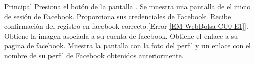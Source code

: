 	\newpage
	\begin{UCtrayectoria}{Principal}
	\UCpaso [\UCactor] Presiona el botón   de la pantalla  .
	\UCpaso Se muestra una pantalla de el inicio de sesión de Facebook.
	\UCpaso Proporciona sus credenciales de Facebook.
	\UCpaso[\UCactor] Recibe confirmación del registro en facebook correcto.[Error  \ref{EM-WebBolsa-CU0-E1}].
	\UCpaso Obtiene la imagen asociada a su cuenta de facebook.
	\UCpaso Obtiene el enlace a su pagina de facebook.
	\UCpaso Muestra la pantalla  con la foto del perfil y un enlace con el nombre de su perfil de Facebook obtenidos anteriormente.
	
\end{UCtrayectoria}


